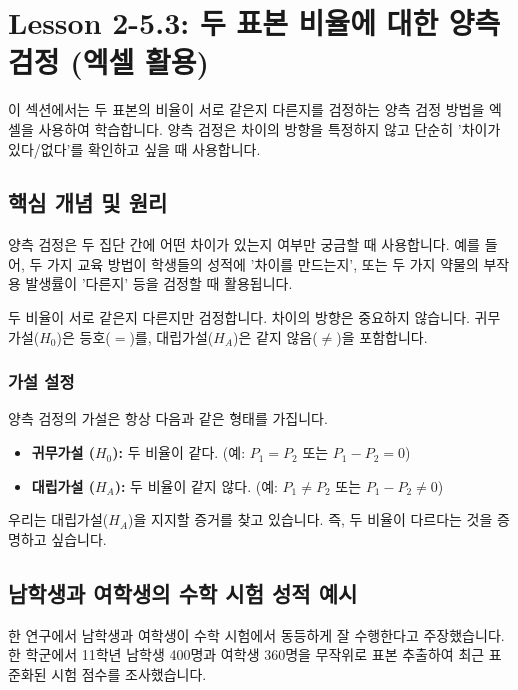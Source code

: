 \documentclass[11pt,a4paper]{article}
\theoremstyle{definition}
\begin{document}
\newpage
\section{Lesson 2-5.3: 두 표본 비율에 대한 양측 검정 (엑셀 활용)}

이 섹션에서는 두 표본의 비율이 서로 같은지 다른지를 검정하는 양측 검정 방법을 엑셀을 사용하여 학습합니다. 양측 검정은 차이의 방향을 특정하지 않고 단순히 '차이가 있다/없다'를 확인하고 싶을 때 사용합니다.

\subsection{핵심 개념 및 원리}

양측 검정은 두 집단 간에 어떤 차이가 있는지 여부만 궁금할 때 사용합니다. 예를 들어, 두 가지 교육 방법이 학생들의 성적에 '차이를 만드는지', 또는 두 가지 약물의 부작용 발생률이 '다른지' 등을 검정할 때 활용됩니다.

\begin{summarybox}[title=양측 검정의 핵심:]
두 비율이 서로 같은지 다른지만 검정합니다. 차이의 방향은 중요하지 않습니다.
귀무가설($H_0$)은 등호($=$)를, 대립가설($H_A$)은 같지 않음($\neq$)을 포함합니다.
\end{summarybox}

\subsubsection{가설 설정}
양측 검정의 가설은 항상 다음과 같은 형태를 가집니다.

\begin{itemize}
    \item \textbf{귀무가설 ($H_0$):} 두 비율이 같다. (예: $P_1 = P_2$ 또는 $P_1 - P_2 = 0$)
    \item \textbf{대립가설 ($H_A$):} 두 비율이 같지 않다. (예: $P_1 \neq P_2$ 또는 $P_1 - P_2 \neq 0$)
\end{itemize}
우리는 대립가설($H_A$)을 지지할 증거를 찾고 있습니다. 즉, 두 비율이 다르다는 것을 증명하고 싶습니다.

\subsection{남학생과 여학생의 수학 시험 성적 예시}

한 연구에서 남학생과 여학생이 수학 시험에서 동등하게 잘 수행한다고 주장했습니다. 한 학군에서 11학년 남학생 400명과 여학생 360명을 무작위로 표본 추출하여 최근 표준화된 시험 점수를 조사했습니다.
\end{document}
